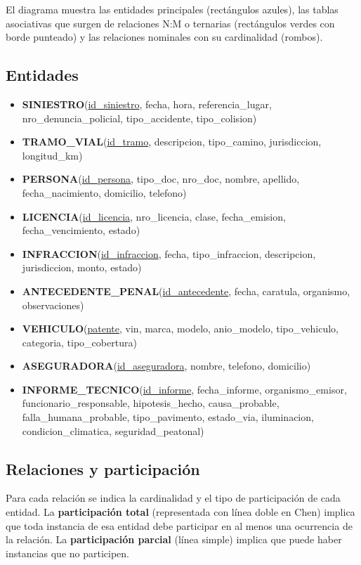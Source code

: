 \documentclass[12pt,a4paper]{article}
\begin{document}
El diagrama muestra las entidades principales (rectángulos azules), las tablas asociativas que surgen de relaciones N:M o ternarias (rectángulos verdes con borde punteado) y las relaciones nominales con su cardinalidad (rombos).

\subsection*{Entidades}

\begin{itemize}[leftmargin=*]
    \item \textbf{SINIESTRO}(\underline{id\_siniestro}, fecha, hora, referencia\_lugar, nro\_denuncia\_policial, tipo\_accidente, tipo\_colision)
    \item \textbf{TRAMO\_VIAL}(\underline{id\_tramo}, descripcion, tipo\_camino, jurisdiccion, longitud\_km)
    \item \textbf{PERSONA}(\underline{id\_persona}, tipo\_doc, nro\_doc, nombre, apellido, fecha\_nacimiento, domicilio, telefono)
    \item \textbf{LICENCIA}(\underline{id\_licencia}, nro\_licencia, clase, fecha\_emision, fecha\_vencimiento, estado)
    \item \textbf{INFRACCION}(\underline{id\_infraccion}, fecha, tipo\_infraccion, descripcion, jurisdiccion, monto, estado)
    \item \textbf{ANTECEDENTE\_PENAL}(\underline{id\_antecedente}, fecha, caratula, organismo, observaciones)
    \item \textbf{VEHICULO}(\underline{patente}, vin, marca, modelo, anio\_modelo, tipo\_vehiculo, categoria, tipo\_cobertura)
    \item \textbf{ASEGURADORA}(\underline{id\_aseguradora}, nombre, telefono, domicilio)
    \item \textbf{INFORME\_TECNICO}(\underline{id\_informe}, fecha\_informe, organismo\_emisor, funcionario\_responsable, hipotesis\_hecho, causa\_probable, falla\_humana\_probable, tipo\_pavimento, estado\_via, iluminacion, condicion\_climatica, seguridad\_peatonal)
\end{itemize}

\subsection*{Relaciones y participación}

Para cada relación se indica la cardinalidad y el tipo de participación de cada entidad. La \textbf{participación total} (representada con línea doble en Chen) implica que toda instancia de esa entidad debe participar en al menos una ocurrencia de la relación. La \textbf{participación parcial} (línea simple) implica que puede haber instancias que no participen.
\end{document}
